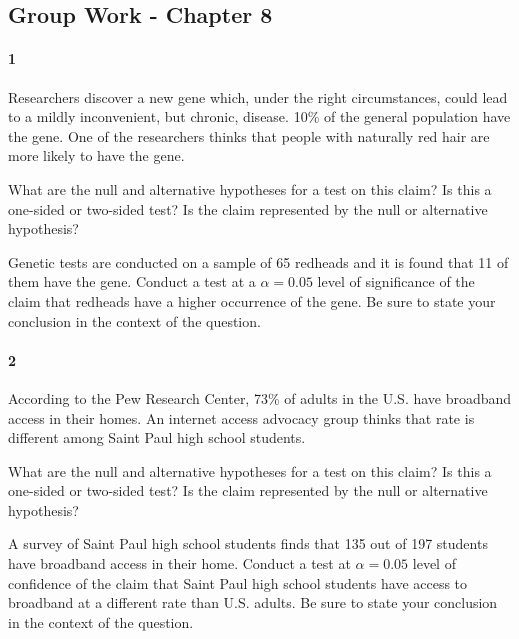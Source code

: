 \documentclass{article}
\begin{document}
\begin{flushleft}
\section*{Group Work - Chapter 8}
\paragraph{1} Researchers discover a new gene which, under the right circumstances, could lead to a mildly inconvenient, but chronic, disease. 10\% of the general population have the gene. One of the researchers thinks that people with naturally red hair are more likely to have the gene.
\begin{enumalpha}
\item What are the null and alternative hypotheses for a test on this claim? Is this a one-sided or two-sided test? Is the claim represented by the null or alternative hypothesis?
\vspace{2.5in}
\item Genetic tests are conducted on a sample of 65 redheads and it is found that 11 of them have the gene. Conduct a test at a $\alpha = 0.05$ level of significance of the claim that redheads have a higher occurrence of the gene. Be sure to state your conclusion in the context of the question.
\end{enumalpha}



\newpage
\paragraph{2} According to the Pew Research Center, 73\% of adults in the U.S. have broadband access in their homes. An internet access advocacy group thinks that rate is different among Saint Paul high school students.
\begin{enumalpha}
\item What are the null and alternative hypotheses for a test on this claim? Is this a one-sided or two-sided test? Is the claim represented by the null or alternative hypothesis?
\vspace{2.5in}
\item A survey of Saint Paul high school students finds that 135 out of 197 students have broadband access in their home. Conduct a test at $\alpha=0.05$ level of confidence of the claim that Saint Paul high school students have access to broadband at a different rate than U.S. adults. Be sure to state your conclusion in the context of the question.
\end{enumalpha}


\end{flushleft}
\end{document}
